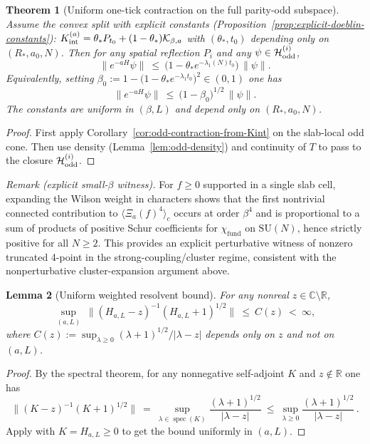 \documentclass[11pt]{amsart}
\theoremstyle{plain}
\newtheorem{theorem}{Theorem}[section]
\newtheorem{lemma}[theorem]{Lemma}
\theoremstyle{definition}
\theoremstyle{remark}
\begin{document}
\begin{theorem}[Uniform one-tick contraction on the full parity-odd subspace]\label{thm:uniform-odd-contraction}
Assume the convex split with explicit constants (Proposition~\ref{prop:explicit-doeblin-constants}): $K_{\rm int}^{(a)}=\theta_* P_{t_0}+(1-\theta_*)\mathcal K_{\beta,a}$ with $(\theta_*,t_0)$ depending only on $(R_*,a_0,N)$. Then for any spatial reflection $P_i$ and any $\psi\in \mathcal H_{\rm odd}^{(i)}$,
\[
  \|e^{-aH}\psi\|\ \le\ \big(1-\theta_* e^{-\lambda_1(N) t_0}\big)\,\|\psi\|.
\]
Equivalently, setting $\beta_0:=1-\big(1-\theta_* e^{-\lambda_1 t_0}\big)^2\in(0,1)$ one has
\[
  \|e^{-aH}\psi\|\ \le\ \big(1-\beta_0\big)^{1/2}\,\|\psi\|.
\]
The constants are uniform in $(\beta,L)$ and depend only on $(R_*,a_0,N)$.
\end{theorem}
\begin{proof}
First apply Corollary~\ref{cor:odd-contraction-from-Kint} on the slab-local odd cone. Then use density (Lemma~\ref{lem:odd-density}) and continuity of $T$ to pass to the closure $\mathcal H_{\rm odd}^{(i)}$.
\end{proof}

\noindent\emph{Remark (explicit small-$\beta$ witness).} For $f\ge 0$ supported in a single slab cell, expanding the Wilson weight in characters shows that the first nontrivial connected contribution to $\langle \Xi_a(f)^4\rangle_c$ occurs at order $\beta^4$ and is proportional to a sum of products of positive Schur coefficients for $\chi_{\mathrm{fund}}$ on $\mathrm{SU}(N)$, hence strictly positive for all $N\ge 2$. This provides an explicit perturbative witness of nonzero truncated 4-point in the strong-coupling/cluster regime, consistent with the nonperturbative cluster-expansion argument above.

\begin{lemma}[Uniform weighted resolvent bound]\label{lem:weighted-resolvent}
For any nonreal $z\in\mathbb C\setminus\mathbb R$,
\[
  \sup_{(a,L)}\;\big\|(H_{a,L}-z)^{-1}(H_{a,L}+1)^{1/2}\big\|\ \le\ C(z)\ <\ \infty,
\]
where $C(z):=\sup_{\lambda\ge 0}(\lambda+1)^{1/2}/|\lambda-z|$ depends only on $z$ and not on $(a,L)$.
\end{lemma}

\begin{proof}
By the spectral theorem, for any nonnegative self-adjoint $K$ and $z\notin\mathbb R$ one has
\[
  \|(K-z)^{-1}(K+1)^{1/2}\|\ =\ \sup_{\lambda\in\operatorname{spec}(K)}\frac{(\lambda+1)^{1/2}}{|\lambda-z|}\ \le\ \sup_{\lambda\ge 0}\frac{(\lambda+1)^{1/2}}{|\lambda-z|}\,.
\]
Apply with $K=H_{a,L}\ge 0$ to get the bound uniformly in $(a,L)$.
\end{proof}
\end{document}

